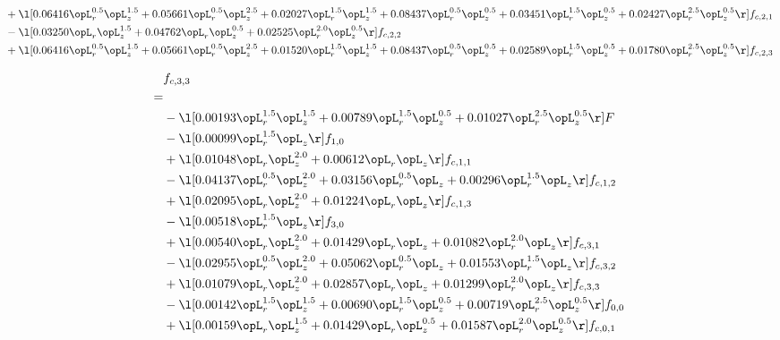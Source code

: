 \begin{alignat}{2}
& + \l[  0.06416 \opL_r^{0.5} \opL_z^{1.5} +  0.05661 \opL_r^{0.5} \opL_z^{2.5} +  0.02027 \opL_r^{1.5} \opL_z^{1.5} +  0.08437 \opL_r^{0.5} \opL_z^{0.5} +  0.03451 \opL_r^{1.5} \opL_z^{0.5} +  0.02427 \opL_r^{2.5} \opL_z^{0.5}  \r] f_{c,2,1} \nonumber \\ 
& - \l[  0.03250 \opL_r \opL_z^{1.5} +  0.04762 \opL_r \opL_z^{0.5} +  0.02525 \opL_r^{2.0} \opL_z^{0.5}  \r] f_{c,2,2} \nonumber \\ 
& + \l[  0.06416 \opL_r^{0.5} \opL_z^{1.5} +  0.05661 \opL_r^{0.5} \opL_z^{2.5} +  0.01520 \opL_r^{1.5} \opL_z^{1.5} +  0.08437 \opL_r^{0.5} \opL_z^{0.5} +  0.02589 \opL_r^{1.5} \opL_z^{0.5} +  0.01780 \opL_r^{2.5} \opL_z^{0.5}  \r] f_{c,2,3} \nonumber \\ 
\end{alignat} 


\begin{alignat}{2} 
\label{eq:f_33_1} 
& f_{c,3,3} \nonumber \\ 
 = \\ 
& - \l[  0.00193 \opL_r^{1.5} \opL_z^{1.5} +  0.00789 \opL_r^{1.5} \opL_z^{0.5} +  0.01027 \opL_r^{2.5} \opL_z^{0.5}  \r] F \nonumber \\ 
& - \l[  0.00099 \opL_r^{1.5} \opL_z  \r] f_{1,0} \nonumber \\ 
& + \l[  0.01048 \opL_r \opL_z^{2.0} +  0.00612 \opL_r \opL_z  \r] f_{c,1,1} \nonumber \\ 
& - \l[  0.04137 \opL_r^{0.5} \opL_z^{2.0} +  0.03156 \opL_r^{0.5} \opL_z +  0.00296 \opL_r^{1.5} \opL_z  \r] f_{c,1,2} \nonumber \\ 
& + \l[  0.02095 \opL_r \opL_z^{2.0} +  0.01224 \opL_r \opL_z  \r] f_{c,1,3} \nonumber \\ 
& - \l[  0.00518 \opL_r^{1.5} \opL_z  \r] f_{3,0} \nonumber \\ 
& + \l[  0.00540 \opL_r \opL_z^{2.0} +  0.01429 \opL_r \opL_z +  0.01082 \opL_r^{2.0} \opL_z  \r] f_{c,3,1} \nonumber \\ 
& - \l[  0.02955 \opL_r^{0.5} \opL_z^{2.0} +  0.05062 \opL_r^{0.5} \opL_z +  0.01553 \opL_r^{1.5} \opL_z  \r] f_{c,3,2} \nonumber \\ 
& + \l[  0.01079 \opL_r \opL_z^{2.0} +  0.02857 \opL_r \opL_z +  0.01299 \opL_r^{2.0} \opL_z  \r] f_{c,3,3} \nonumber \\ 
& - \l[  0.00142 \opL_r^{1.5} \opL_z^{1.5} +  0.00690 \opL_r^{1.5} \opL_z^{0.5} +  0.00719 \opL_r^{2.5} \opL_z^{0.5}  \r] f_{0,0} \nonumber \\ 
& + \l[  0.00159 \opL_r \opL_z^{1.5} +  0.01429 \opL_r \opL_z^{0.5} +  0.01587 \opL_r^{2.0} \opL_z^{0.5}  \r] f_{c,0,1} \nonumber \\ 

\end{alignat}
